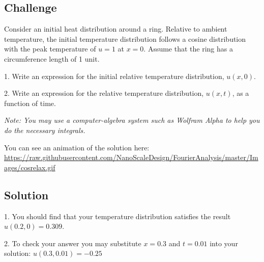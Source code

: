 \subsection*{Challenge}
Consider an initial heat distribution around a ring. Relative to ambient temperature, the initial temperature distribution follows a cosine distribution with the peak temperature of $u=1$ at $x=0$. Assume that the ring has a circumference length of 1 unit.

1. Write an expression for the initial relative temperature distribution, $u(x,0)$.

2. Write an expression for the relative temperature distribution, $u(x,t)$, as a function of time.

\emph{Note: You may use a computer-algebra system such as Wolfram Alpha to help you do the necessary integrals.}

You can see an animation of the solution here:\\
\url{https://raw.githubusercontent.com/NanoScaleDesign/FourierAnalysis/master/Images/cosrelax.gif}

\subsection*{Solution}
1. You should find that your temperature distribution satisfies the result $u(0.2,0) = 0.309$.

2. To check your answer you may substitute $x=0.3$ and $t=0.01$ into your solution: $u(0.3,0.01) = -0.25$
